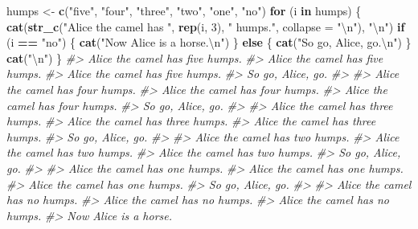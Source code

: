 \documentclass[]{book}
\newenvironment{Shaded}{\begin{snugshade}}{\end{snugshade}}
\newcommand{\CharTok}[1]{\textcolor[rgb]{0.31,0.60,0.02}{#1}}
\newcommand{\CommentTok}[1]{\textcolor[rgb]{0.56,0.35,0.01}{\textit{#1}}}
\newcommand{\ControlFlowTok}[1]{\textcolor[rgb]{0.13,0.29,0.53}{\textbf{#1}}}
\newcommand{\DataTypeTok}[1]{\textcolor[rgb]{0.13,0.29,0.53}{#1}}
\newcommand{\DecValTok}[1]{\textcolor[rgb]{0.00,0.00,0.81}{#1}}
\newcommand{\KeywordTok}[1]{\textcolor[rgb]{0.13,0.29,0.53}{\textbf{#1}}}
\newcommand{\NormalTok}[1]{#1}
\newcommand{\OperatorTok}[1]{\textcolor[rgb]{0.81,0.36,0.00}{\textbf{#1}}}
\newcommand{\StringTok}[1]{\textcolor[rgb]{0.31,0.60,0.02}{#1}}
\theoremstyle{plain}
\theoremstyle{remark}
\theoremstyle{definition}
\theoremstyle{definition}
\theoremstyle{definition}
\theoremstyle{remark}
\begin{document}
\begin{Shaded}
\begin{Highlighting}[]
\NormalTok{humps <-}\StringTok{ }\KeywordTok{c}\NormalTok{(}\StringTok{"five"}\NormalTok{, }\StringTok{"four"}\NormalTok{, }\StringTok{"three"}\NormalTok{, }\StringTok{"two"}\NormalTok{, }\StringTok{"one"}\NormalTok{, }\StringTok{"no"}\NormalTok{)}
\ControlFlowTok{for}\NormalTok{ (i }\ControlFlowTok{in}\NormalTok{ humps) \{}
  \KeywordTok{cat}\NormalTok{(}\KeywordTok{str_c}\NormalTok{(}\StringTok{"Alice the camel has "}\NormalTok{, }\KeywordTok{rep}\NormalTok{(i, }\DecValTok{3}\NormalTok{), }\StringTok{" humps."}\NormalTok{,}
             \DataTypeTok{collapse =} \StringTok{"}\CharTok{\textbackslash{}n}\StringTok{"}\NormalTok{), }\StringTok{"}\CharTok{\textbackslash{}n}\StringTok{"}\NormalTok{)}
  \ControlFlowTok{if}\NormalTok{ (i }\OperatorTok{==}\StringTok{ "no"}\NormalTok{) \{}
    \KeywordTok{cat}\NormalTok{(}\StringTok{"Now Alice is a horse.}\CharTok{\textbackslash{}n}\StringTok{"}\NormalTok{)}
\NormalTok{  \} }\ControlFlowTok{else}\NormalTok{ \{}
    \KeywordTok{cat}\NormalTok{(}\StringTok{"So go, Alice, go.}\CharTok{\textbackslash{}n}\StringTok{"}\NormalTok{)}
\NormalTok{  \}}
  \KeywordTok{cat}\NormalTok{(}\StringTok{"}\CharTok{\textbackslash{}n}\StringTok{"}\NormalTok{)}
\NormalTok{\}}
\CommentTok{#> Alice the camel has five humps.}
\CommentTok{#> Alice the camel has five humps.}
\CommentTok{#> Alice the camel has five humps. }
\CommentTok{#> So go, Alice, go.}
\CommentTok{#> }
\CommentTok{#> Alice the camel has four humps.}
\CommentTok{#> Alice the camel has four humps.}
\CommentTok{#> Alice the camel has four humps. }
\CommentTok{#> So go, Alice, go.}
\CommentTok{#> }
\CommentTok{#> Alice the camel has three humps.}
\CommentTok{#> Alice the camel has three humps.}
\CommentTok{#> Alice the camel has three humps. }
\CommentTok{#> So go, Alice, go.}
\CommentTok{#> }
\CommentTok{#> Alice the camel has two humps.}
\CommentTok{#> Alice the camel has two humps.}
\CommentTok{#> Alice the camel has two humps. }
\CommentTok{#> So go, Alice, go.}
\CommentTok{#> }
\CommentTok{#> Alice the camel has one humps.}
\CommentTok{#> Alice the camel has one humps.}
\CommentTok{#> Alice the camel has one humps. }
\CommentTok{#> So go, Alice, go.}
\CommentTok{#> }
\CommentTok{#> Alice the camel has no humps.}
\CommentTok{#> Alice the camel has no humps.}
\CommentTok{#> Alice the camel has no humps. }
\CommentTok{#> Now Alice is a horse.}
\end{Highlighting}
\end{Shaded}
\end{document}
